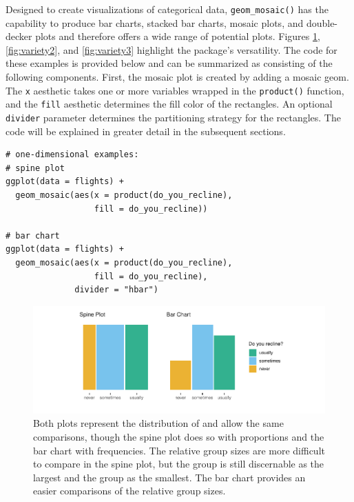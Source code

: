 Designed to create visualizations of categorical data, \texttt{geom\_mosaic()} has the capability to produce bar charts, stacked bar charts, mosaic plots, and double-decker plots and therefore offers a wide range of potential plots. Figures \ref{fig:variety1}, \ref{fig:variety2}, and \ref{fig:variety3} highlight the package's versatility. The code for these examples is provided below and can be summarized as consisting of the following components. First, the mosaic plot is created by adding a mosaic geom. The \texttt{x} aesthetic takes one or more variables wrapped in the \texttt{product()} function, and the \texttt{fill} aesthetic determines the fill color of the rectangles. An optional \texttt{divider} parameter determines the partitioning strategy for the rectangles. The code will be explained in greater detail in the subsequent sections.

\begin{verbatim}
# one-dimensional examples:
# spine plot
ggplot(data = flights) + 
  geom_mosaic(aes(x = product(do_you_recline), 
                  fill = do_you_recline))

# bar chart
ggplot(data = flights) + 
  geom_mosaic(aes(x = product(do_you_recline),
                  fill = do_you_recline), 
              divider = "hbar") 
\end{verbatim}

\begin{figure}[!h]

{\centering \includegraphics[width=1\linewidth]{jeppson-hofmann_files/figure-latex/variety1-1} 

}

\caption{Both plots represent the distribution of  and allow the same comparisons, though the spine plot does so with proportions and the bar chart with frequencies. The relative group sizes are more difficult to compare in the spine plot, but the  group is still discernable as the largest and the  group as the smallest. The bar chart provides an easier comparisons of the relative group sizes.}\label{fig:variety1}
\end{figure}

